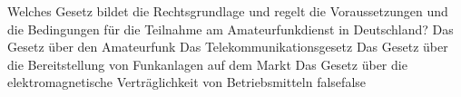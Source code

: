     {Welches Gesetz bildet die Rechtsgrundlage und regelt die Voraussetzungen und die Bedingungen für die Teilnahme am Amateurfunkdienst in Deutschland?}
    {Das Gesetz über den Amateurfunk}
    {Das Telekommunikationsgesetz}
    {Das Gesetz über die Bereitstellung von Funkanlagen auf dem Markt}
    {Das Gesetz über die elektromagnetische Verträglichkeit von Betriebsmitteln}
    {false}{false}
